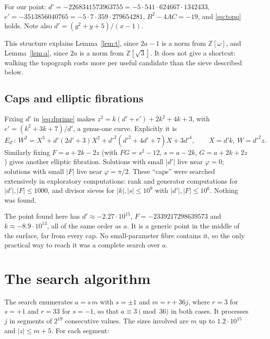 \documentclass[11pt]{article}
\theoremstyle{remark}
\theoremstyle{definition}
\newcommand{\Z}{\mathbb{Z}}
\begin{document}
For our point: $d'=-2268341573963755=-5\cdot541\cdot624667\cdot1342433$,
$e'=-3513856040765=-5\cdot7\cdot359\cdot279654281$, $B^2-4AC=-19$, and \eqref{eq:topo} holds.  Note
also $d'=(y^2+y+5)/(x-1)$.

This structure explains Lemma~\ref{lem:t}, since $2a-1$ is a norm from $\Z[\omega]$, and
Lemma~\ref{lem:a}, since $2a$ is a norm from $\Z[\sqrt3]$.  It does not give a shortcut: walking
the topograph costs more per useful candidate than the sieve described below.

\subsection{Caps and elliptic fibrations}\label{sec:caps}
Fixing $d'$ in \eqref{eq:dprime} makes $z^2=k(d'+e')+2k^2+4k+3$, with $e'=(k^2+3k+7)/d'$, a
genus-one curve.  Explicitly it is
\[
E_{d'}:\ W^2=X^3+d'(2d'+3)X^2+d'^2(d'^2+4d'+7)X+3d'^4,\qquad X=d'k,\ W=d'^2z .
\]
Similarly fixing $F=a+2k-2z$ (with $FG=s^2-12$, $s=a-2k$, $G=a+2k+2z$) gives another elliptic
fibration.  Solutions with small $|d'|$ live near $\varphi=0$; solutions with small $|F|$ live
near $\varphi=\pi/2$.  These ``caps'' were searched extensively in exploratory computations:
rank and generator computations for $|d'|,|F|\le 1000$, and divisor sieves for $|k|,|s|\le10^9$
with $|d'|,|F|\le10^6$.
Nothing was found.

The point found here has $d'\approx-2.27\cdot10^{15}$, $F=-2339217298639573$ and
$k\approx-8.9\cdot10^{13}$, all of the same order as $a$.  It is a generic point in the middle
of the surface, far from every cap.  No small-parameter fibre contains it, so the only practical
way to reach it was a complete search over $a$.

\section{The search algorithm}\label{sec:algorithm}

The search enumerates $a=s\,m$ with $s=\pm1$ and $m=r+36j$, where $r=3$ for $s=+1$ and $r=33$ for
$s=-1$, so that $a\equiv3\pmod{36}$ in both cases.  It processes $j$ in segments of $2^{19}$
consecutive values.  The sizes involved are $m$ up to $1.2\cdot10^{15}$ and $|z|\le m+5$.  For each
segment:
\end{document}
